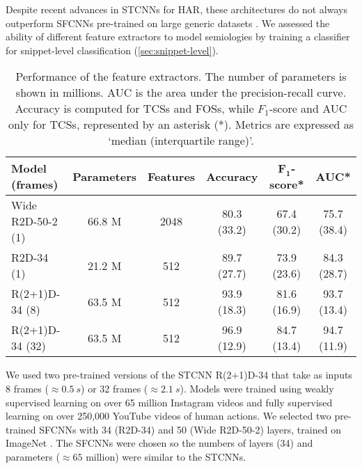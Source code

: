 Despite recent advances in \acp{STCNN} for \ac{HAR}, these architectures do not always outperform \acp{SFCNN} pre-trained on large generic datasets \cite{hutchinson_accuracy_2020}.
We assessed the ability of different feature extractors to model semiologies by training a classifier for snippet-level classification (\cref{sec:snippet-level}).

\begin{table}[t!]
    \setlength{\tabcolsep}{3pt}
    \centering
    \caption{%
        Performance of the feature extractors.
        The number of parameters is shown in millions.
        AUC is the area under the precision-recall curve.
        Accuracy is computed for \acp{TCS} and \acp{FOS}, while $F_1$-score and AUC only for \acp{TCS}, represented by an asterisk (*).
        Metrics are expressed as `median (interquartile range)'.
    }
    \label{tab:models}
    \begin{tabular}{l*5c}
        \toprule
        \textbf{Model (frames)} & \textbf{Parameters} & \textbf{Features} & \textbf{Accuracy} & $\bm{F_1}$\textbf{-score}* & \textbf{AUC}* \\
        \midrule
        Wide R2D-50-2 (1)       &              66.8 M &              2048 &       80.3 (33.2) &                67.4 (30.2) &   75.7 (38.4) \\
        R2D-34 (1)              &              21.2 M &               512 &       89.7 (27.7) &                73.9 (23.6) &   84.3 (28.7) \\
        R(2+1)D-34 (8)          &              63.5 M &               512 &       93.9 (18.3) &                81.6 (16.9) &   93.7 (13.4) \\
        R(2+1)D-34 (32)         &              63.5 M &               512 &       96.9 (12.9) &                84.7 (13.4) &   94.7 (11.9) \\
        \bottomrule
    \end{tabular}
\end{table}

We used two pre-trained versions of the \ac{STCNN} R(2+1)D-34 \cite{ghadiyaram_large-scale_2019} that take as inputs 8 frames ($\approx \SI{0.5}{s}$) or 32 frames ($\approx \SI{2.1}{s}$).
Models were trained using weakly supervised learning on over 65 million Instagram videos and fully supervised learning on over 250,000 YouTube videos of human actions.
We selected two pre-trained \acp{SFCNN} with 34 (R2D-34) and 50 (Wide R2D-50-2) layers, trained on ImageNet \cite{zagoruyko_wide_2017}.
The \acp{SFCNN} were chosen so the numbers of layers (34) and parameters ($\approx 65$ million) were similar to the \acp{STCNN}.

